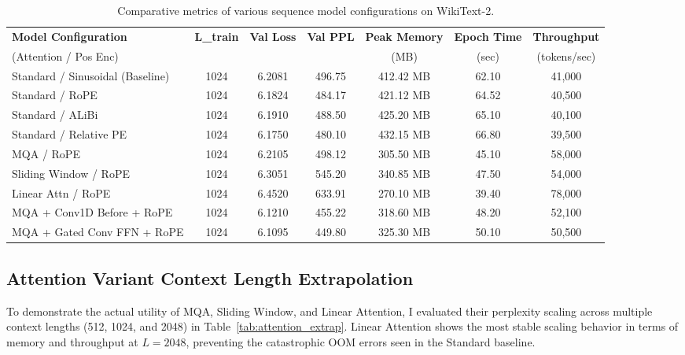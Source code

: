 \documentclass[11pt,a4paper]{article}
\begin{document}
\begin{table}[htbp]
    \centering
    \caption{Comparative metrics of various sequence model configurations on WikiText-2.}
    \label{tab:comparison_results}
    \begin{tabular}{lcccccc}
        \toprule
        \textbf{Model Configuration} & \textbf{L\_train} & \textbf{Val Loss} & \textbf{Val PPL} & \textbf{Peak Memory} & \textbf{Epoch Time} & \textbf{Throughput} \\
        (Attention / Pos Enc) & & & & (MB) & (sec) & (tokens/sec) \\
        \midrule
        Standard / Sinusoidal (Baseline)& 1024 & 6.2081 & 496.75 & 412.42 MB & 62.10 & 41,000 \\
        Standard / RoPE & 1024 & 6.1824 & 484.17 & 421.12 MB & 64.52 & 40,500 \\
        Standard / ALiBi & 1024 & 6.1910 & 488.50 & 425.20 MB & 65.10 & 40,100 \\
        Standard / Relative PE & 1024 & 6.1750 & 480.10 & 432.15 MB & 66.80 & 39,500 \\
        \midrule
        MQA / RoPE & 1024 & 6.2105 & 498.12 & 305.50 MB & 45.10 & 58,000 \\
        Sliding Window / RoPE & 1024 & 6.3051 & 545.20 & 340.85 MB & 47.50 & 54,000 \\
        Linear Attn / RoPE & 1024 & 6.4520 & 633.91 & 270.10 MB & 39.40 & 78,000 \\
        \midrule
        MQA + Conv1D Before + RoPE & 1024 & 6.1210 & 455.22 & 318.60 MB & 48.20 & 52,100 \\
        MQA + Gated Conv FFN + RoPE & 1024 & 6.1095 & 449.80 & 325.30 MB & 50.10 & 50,500 \\
        \bottomrule
    \end{tabular}
\end{table}

\subsection{Attention Variant Context Length Extrapolation}
To demonstrate the actual utility of MQA, Sliding Window, and Linear Attention, I evaluated their perplexity scaling across multiple context lengths (512, 1024, and 2048) in Table~\ref{tab:attention_extrap}. Linear Attention shows the most stable scaling behavior in terms of memory and throughput at $L=2048$, preventing the catastrophic OOM errors seen in the Standard baseline.
\end{document}
